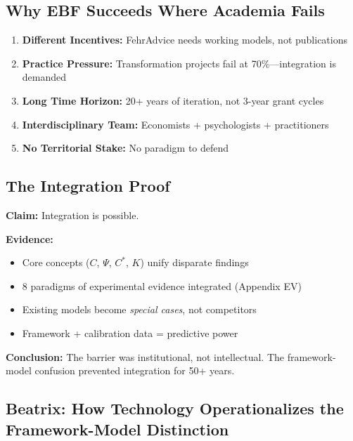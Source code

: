 \subsection{Why EBF Succeeds Where Academia Fails}

\begin{enumerate}
\item \textbf{Different Incentives:} FehrAdvice needs working models, not publications
\item \textbf{Practice Pressure:} Transformation projects fail at 70\%—integration is demanded
\item \textbf{Long Time Horizon:} 20+ years of iteration, not 3-year grant cycles
\item \textbf{Interdisciplinary Team:} Economists + psychologists + practitioners
\item \textbf{No Territorial Stake:} No paradigm to defend
\end{enumerate}

\subsection{The Integration Proof}

\begin{tcolorbox}[colback=green!5!white, colframe=green!75!black,
    title=Evidence-Based Framework: Existence Proof]
\textbf{Claim:} Integration is possible.

\textbf{Evidence:}
\begin{itemize}
\item Core concepts ($C$, $\Psi$, $C^*$, $K$) unify disparate findings
\item 8 paradigms of experimental evidence integrated (Appendix EV)
\item Existing models become \textit{special cases}, not competitors
\item Framework + calibration data = predictive power
\end{itemize}

\textbf{Conclusion:} The barrier was institutional, not intellectual.
The framework-model confusion prevented integration for 50+ years.
\end{tcolorbox}


\subsection{Beatrix: How Technology Operationalizes the Framework-Model Distinction}
\label{sec:meta-beatrix}

